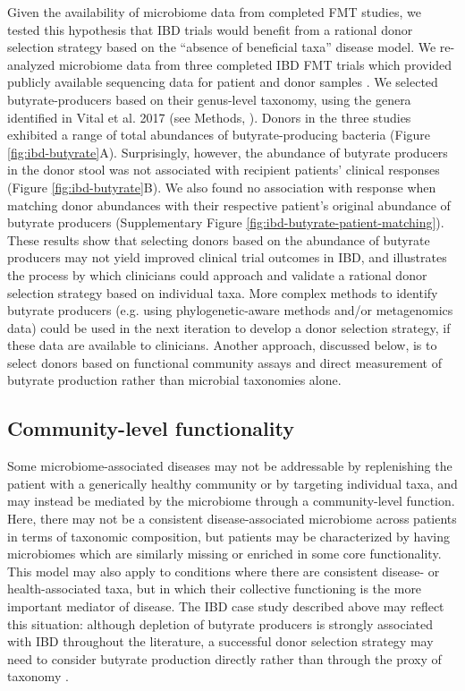 Given the availability of microbiome data from completed FMT studies, we tested this hypothesis that IBD trials would benefit from a rational donor selection strategy based on the “absence of beneficial taxa” disease model.
We re-analyzed microbiome data from three completed IBD FMT trials which provided publicly available sequencing data for patient and donor samples \cite{Kump2018,Goyal2018,Jacob2017}.
We selected butyrate-producers based on their genus-level taxonomy, using the genera identified in Vital et al. 2017 (see Methods, \cite{Vital2017}).
Donors in the three studies exhibited a range of total abundances of butyrate-producing bacteria (Figure \ref{fig:ibd-butyrate}A).
Surprisingly, however, the abundance of butyrate producers in the donor stool was not associated with recipient patients' clinical responses (Figure \ref{fig:ibd-butyrate}B).
We also found no association with response when matching donor abundances with their respective patient's original abundance of butyrate producers (Supplementary Figure \ref{fig:ibd-butyrate-patient-matching}).
These results show that selecting donors based on the abundance of butyrate producers may not yield improved clinical trial outcomes in IBD, and illustrates the process by which clinicians could approach and validate a rational donor selection strategy based on individual taxa.
More complex methods to identify butyrate producers (e.g. using phylogenetic-aware methods and/or metagenomics data) could be used in the next iteration to develop a donor selection strategy, if these data are available to clinicians.
Another approach, discussed below, is to select donors based on functional community assays and direct measurement of butyrate production rather than microbial taxonomies alone.

\subsection{Community-level functionality}

Some microbiome-associated diseases may not be addressable by replenishing the patient with a generically healthy community or by targeting individual taxa, and may instead be mediated by the microbiome through a community-level function.
Here, there may not be a consistent disease-associated microbiome across patients in terms of taxonomic composition, but patients may be characterized by having microbiomes which are similarly missing or enriched in some core functionality.
This model may also apply to conditions where there are consistent disease- or health-associated taxa, but in which their collective functioning is the more important mediator of disease.
The IBD case study described above may reflect this situation: although depletion of butyrate producers is strongly associated with IBD throughout the literature, a successful donor selection strategy may need to consider butyrate production directly rather than through the proxy of taxonomy \cite{Duvallet2017,Schrimer2018}.

